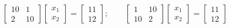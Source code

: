 \documentclass[10pt]{article}
\begin{document}
    $$
    \left[\begin{array}{cc}
    10 & 1 \\
    2 & 10
    \end{array}\right]\left[\begin{array}{l}
    x_1 \\
    x_2
    \end{array}\right]=\left[\begin{array}{l}
    11 \\
    12
    \end{array}\right]; \qquad\left[\begin{array}{cc}
    1 & 10 \\
    10 & 2
    \end{array}\right]\left[\begin{array}{l}
    x_1 \\
    x_2
    \end{array}\right]=\left[\begin{array}{l}
    11 \\
    12
    \end{array}\right]
    $$
\end{document}
